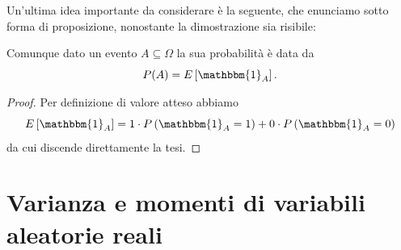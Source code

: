 \documentclass[11pt]{scrartcl}
\begin{document}
	Un'ultima idea importante da considerare è la seguente, che enunciamo sotto forma di proposizione, nonostante la dimostrazione sia risibile:
	\begin{proposition}
		Comunque dato un evento $A\subseteq \Omega$ la sua probabilità è data da
		$$P(A)=E\left[\mathbbm{1}_A\right].$$
	\end{proposition}
	\begin{proof}
		Per definizione di valore atteso abbiamo
		$$E\left[\mathbbm{1}_A\right]=1\cdot P\left(\mathbbm{1}_A=1\right)+0\cdot P\left(\mathbbm{1}_A=0\right)$$
		da cui discende direttamente la tesi.
	\end{proof}
	\newpage
	
	\section{Varianza e momenti di variabili aleatorie reali}
	
\end{document}
